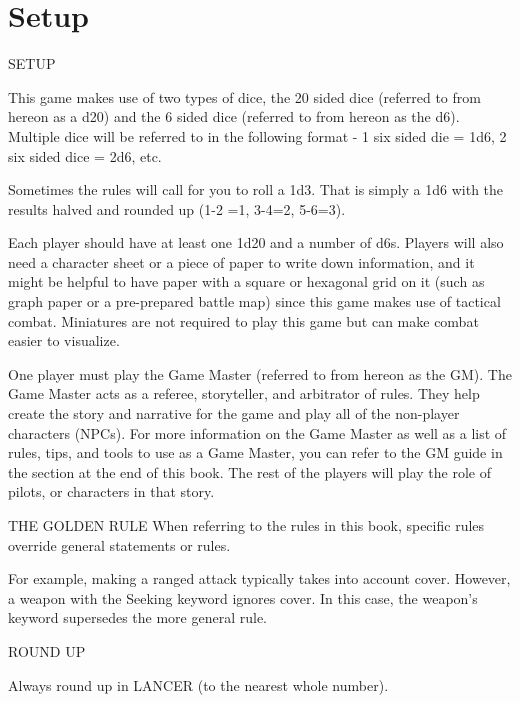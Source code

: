 \chapter{Setup}
                                                  SETUP

This game makes use of two types of dice, the 20 sided dice (referred to from hereon as a d20)
and the 6 sided dice (referred to from hereon as the d6). Multiple dice will be referred to in the
following format - 1 six sided die = 1d6, 2 six sided dice = 2d6, etc.


Sometimes the rules will call for you to roll a 1d3. That is simply a 1d6 with the results halved and
rounded up (1-2 =1, 3-4=2, 5-6=3).


Each player should have at least one 1d20 and a number of d6s. Players will also need a
character sheet or a piece of paper to write down information, and it might be helpful to have
paper with a square or hexagonal grid on it (such as graph paper or a pre-prepared battle map)
since this game makes use of tactical combat. Miniatures are not required to play this game but
can make combat easier to visualize.


One player must play the Game Master (referred to from hereon as the GM). The Game Master
acts as a referee, storyteller, and arbitrator of rules. They help create the story and narrative for
the game and play all of the non-player characters (NPCs). For more information on the Game
Master as well as a list of rules, tips, and tools to use as a Game Master, you can refer to the GM
guide in the section at the end of this book. The rest of the players will play the role of pilots, or
characters in that story.

                                          THE GOLDEN RULE
When referring to the rules in this book, specific rules override general statements or rules.


For example, making a ranged attack typically takes into account cover. However, a weapon with
the Seeking keyword ignores cover. In this case, the weapon’s keyword supersedes the more
general rule.

                                                 ROUND UP




Always round up in LANCER (to the nearest whole number).